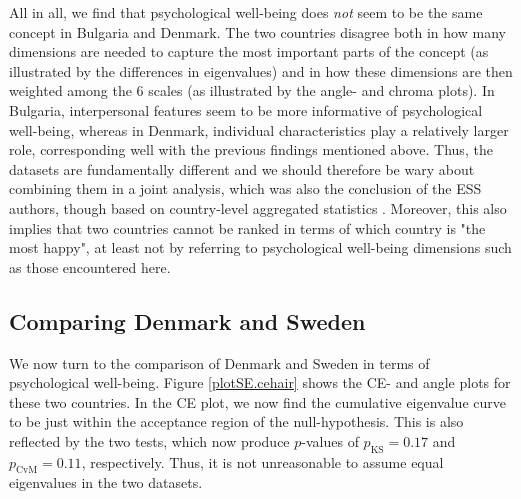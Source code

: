 \documentclass[a4paper,12pt]{article}
\begin{document}

All in all, we find that psychological well-being does \textit{not} seem to be the same concept in Bulgaria and Denmark. The two countries disagree both in how many dimensions are needed to capture the most important parts of the concept (as illustrated by the differences in eigenvalues) and in how these dimensions are then weighted among the 6 scales (as illustrated by the angle- and chroma plots). In Bulgaria, interpersonal features seem to be more informative of psychological well-being, whereas in Denmark, individual characteristics play a relatively larger role, corresponding well with the previous findings mentioned above. Thus, the datasets are fundamentally different and we should therefore be wary about combining them in a joint analysis, which was also the conclusion of the ESS authors, though based on country-level aggregated statistics \cite{ESStopline5}. Moreover, this also implies that two countries cannot be ranked in terms of which country is "the most happy", at least not by referring to psychological well-being dimensions such as those encountered here.

\subsection*{Comparing Denmark and Sweden}
We now turn to the comparison of Denmark and Sweden in terms of psychological well-being. Figure \ref{plotSE.cehair} shows the CE- and angle plots for these two countries. In the CE plot, we now find the cumulative eigenvalue curve to be just within the acceptance region of the null-hypothesis. This is also reflected by the two tests, which now produce $p$-values of $p_\text{KS} = 0.17$ and $p_\text{CvM} = 0.11$, respectively. Thus, it is not unreasonable to assume equal eigenvalues in the two datasets.

\end{document}
